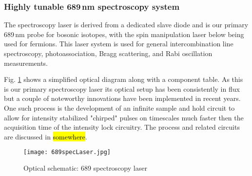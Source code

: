 \subsubsection{Highly tunable 689\,nm spectroscopy system}
The spectroscopy laser is derived from a dedicated slave diode and is our primary 689\,nm probe for bosonic isotopes, with the spin manipulation laser below being used for fermions.
This laser system is used for general intercombination line spectroscopy, photoassociation, Bragg scattering, and Rabi oscillation measurements.

Fig. \ref{fig:689specSch} shows a simplified optical diagram along with a component table.
As this is our primary spectroscopy laser its optical setup has been consistently in flux but a couple of noteworthy innovations have been implemented in recent years.
One such process is the development of an infinite sample and hold circuit to allow for intensity stabilized "chirped" pulses on timescales much faster then the acquisition time of the intensity lock circuitry.
The process and related circuits are discussed in \hl{somewhere}.
	\begin{figure}
	\centerline{
		\texttt{[image: 689specLaser.jpg]}}
		\caption{Optical schematic: 689 spectroscopy laser}
		 \label{fig:689specSch}
	\end{figure}


